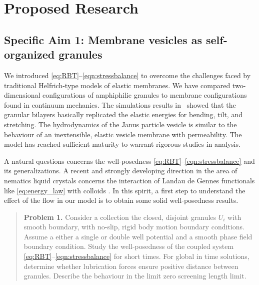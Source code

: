 \section{Proposed Research}
\label{sec:proposed-work}

\subsection{Specific Aim 1: Membrane vesicles as self-organized granules}
\label{sec:specific_aim1}

We introduced \eqref{eq:RBT}--\eqref{eqn:stressbalance} to overcome the challenges faced by
traditional Helfrich-type models of elastic membranes.
We have compared two-dimensional configurations of amphiphilic granules
to membrane configurations found in continuum mechanics.
The simulations results in~\cite{Fu2018_SIAM,FuQuRyYo22}
showed that the granular bilayers 
basically replicated the elastic energies for bending, tilt, and
stretching.
The hydrodynamics of the Janus particle vesicle is similar to the behaviour of an inextensible,
elastic vesicle membrane with permeability.
The model has reached sufficient maturity to warrant 
rigorous studies in analysis.

A natural questions concerns the well-posedness
\eqref{eq:RBT}--\eqref{eqn:stressbalance}
and its generalizations. A recent and strongly developing direction in
the area of nematics liquid crystals concerns the interaction of
Landau de Gennes functionals like \eqref{eq:energy_law} with colloids
\cite{doi:10.1098/rsta.2020.0432}.
In this spirit, a first step to understand the effect of the flow
in our model is to obtain some solid well-posedness results.

\begin{quotation}
  \textbf{Problem 1.} Consider a collection the closed,
  disjoint granules $U_i$ with smooth boundary,
with no-slip, rigid body motion boundary conditions.
Assume a either a single or double well potential
and a smooth phase field boundary condition.  
Study the well-posedness of the coupled system
\eqref{eq:RBT}--\eqref{eqn:stressbalance}
for short times.  For global in time solutions, determine
whether lubrication forces ensure positive distance
between granules.  Describe the behaviour in the limit
zero screening length limit.  
\end{quotation}

